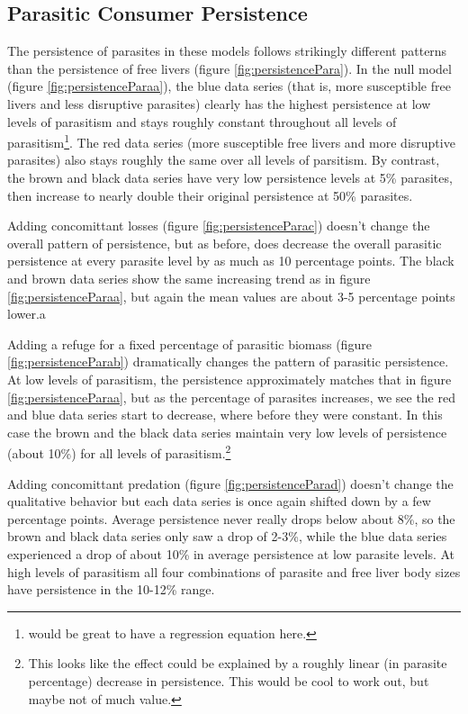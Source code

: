 \documentclass[11pt]{amsart}
\begin{document}
\subsection{Parasitic Consumer Persistence \label{sec:persistencePara}}

The persistence of parasites in these models follows strikingly different patterns than the persistence of free livers (figure \ref{fig:persistencePara}).  In the null model (figure \ref{fig:persistenceParaa}), the blue data series (that is, more susceptible free livers and less disruptive parasites) clearly has the highest persistence at low levels of parasitism and stays roughly constant throughout all levels of parasitism\footnote{would be great to have a regression equation here.}.  The red data series (more susceptible free livers and more disruptive parasites) also stays roughly the same over all levels of parsitism.   By contrast, the brown and black data series have very low persistence levels at 5\% parasites, then increase to nearly double their original persistence at 50\% parasites.

Adding concomittant losses (figure \ref{fig:persistenceParac}) doesn't change the overall pattern of persistence, but as before, does decrease the overall parasitic persistence at every parasite level by as much as 10 percentage points.  The black and brown data series show the same increasing trend as in figure \ref{fig:persistenceParaa}, but again the mean values are about 3-5 percentage points lower.a

Adding a refuge for a fixed percentage of parasitic biomass (figure \ref{fig:persistenceParab}) dramatically changes the pattern of parasitic persistence.  At low levels of parasitism, the persistence approximately matches that in figure \ref{fig:persistenceParaa}, but as the percentage of parasites increases, we see the red and blue data series start to decrease, where before they were constant.  In this case the brown and the black data series maintain very low levels of persistence (about 10\%) for all levels of parasitism.\footnote{This looks like the effect could be explained by a roughly linear (in parasite percentage) decrease in persistence.  This would be cool to work out, but maybe not of much value.}

  Adding concomittant predation (figure \ref{fig:persistenceParad}) doesn't change the qualitative behavior but each data series is once again shifted down by a few percentage points.  Average persistence never really drops below about 8\%, so the brown and black data series only saw a drop of 2-3\%, while the blue data series experienced a drop of about 10\% in average persistence at low parasite levels.  At high levels of parasitism all four combinations of parasite and free liver body sizes have persistence in the 10-12\% range.
\end{document}
